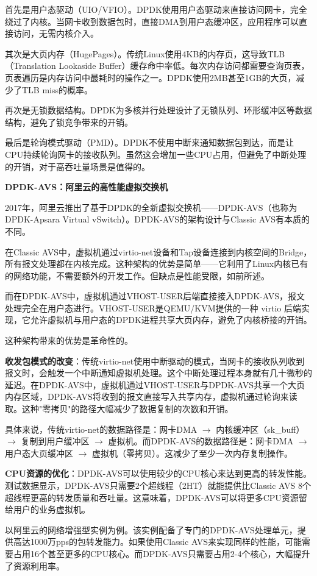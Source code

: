 首先是用户态驱动（UIO/VFIO）。DPDK使用用户态驱动来直接访问网卡，完全绕过了内核。当网卡收到数据包时，直接DMA到用户态缓冲区，应用程序可以直接访问，无需内核介入。

其次是大页内存（HugePages）。传统Linux使用4KB的内存页，这导致TLB（Translation Lookaside Buffer）缓存命中率低。每次内存访问都需要查询页表，页表遍历是内存访问中最耗时的操作之一。DPDK使用2MB甚至1GB的大页，减少了TLB miss的概率。

再次是无锁数据结构。DPDK为多核并行处理设计了无锁队列、环形缓冲区等数据结构，避免了锁竞争带来的开销。

最后是轮询模式驱动（PMD）。DPDK不使用中断来通知数据包到达，而是让CPU持续轮询网卡的接收队列。虽然这会增加一些CPU占用，但避免了中断处理的开销，对于高吞吐量场景是值得的。

\textbf{DPDK-AVS：阿里云的高性能虚拟交换机}

2017年，阿里云推出了基于DPDK的全新虚拟交换机——DPDK-AVS（也称为DPDK-Apsara Virtual vSwitch）。DPDK-AVS的架构设计与Classic AVS有本质的不同。

在Classic AVS中，虚拟机通过virtio-net设备和Tap设备连接到内核空间的Bridge，所有报文处理都在内核完成。这种架构的优势是简单——它利用了Linux内核已有的网络功能，不需要额外的开发工作。但缺点是性能受限，如前所述。

而在DPDK-AVS中，虚拟机通过VHOST-USER后端直接接入DPDK-AVS，报文处理完全在用户态进行。VHOST-USER是QEMU/KVM提供的一种 virtio 后端实现，它允许虚拟机与用户态的DPDK进程共享大页内存，避免了内核桥接的开销。

这种架构带来的优势是革命性的。

\textbf{收发包模式的改变}：传统virtio-net使用中断驱动的模式，当网卡的接收队列收到报文时，会触发一个中断通知虚拟机处理。这个中断处理过程本身就有几十微秒的延迟。在DPDK-AVS中，虚拟机通过VHOST-USER与DPDK-AVS共享一个大页内存区域，DPDK-AVS将收到的报文直接写入共享内存，虚拟机通过轮询来读取。这种"零拷贝"的路径大幅减少了数据复制的次数和开销。

具体来说，传统virtio-net的数据路径是：网卡DMA $\rightarrow$ 内核缓冲区（sk_buff） $\rightarrow$ 复制到用户缓冲区 $\rightarrow$ 虚拟机。而DPDK-AVS的数据路径是：网卡DMA $\rightarrow$ 用户态大页缓冲区 $\rightarrow$ 虚拟机（零拷贝）。这减少了至少一次内存复制操作。

\textbf{CPU资源的优化}：DPDK-AVS可以使用较少的CPU核心来达到更高的转发性能。测试数据显示，DPDK-AVS只需要2个超线程（2HT）就能提供比Classic AVS 8个超线程更高的转发质量和吞吐量。这意味着，DPDK-AVS可以将更多CPU资源留给用户的业务虚拟机。

以阿里云的网络增强型实例为例。该实例配备了专门的DPDK-AVS处理单元，提供高达1000万pps的包转发能力。如果使用Classic AVS来实现同样的性能，可能需要占用16个甚至更多的CPU核心。而DPDK-AVS只需要占用2-4个核心，大幅提升了资源利用率。

